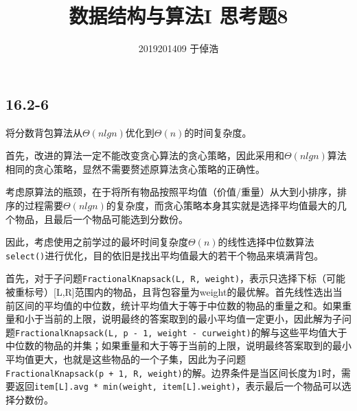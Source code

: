 \documentclass{article}
\title{数据结构与算法I 思考题8}
\author{2019201409 于倬浩}
\begin{document}
\maketitle

\hypertarget{header-n4}{%
\subsection{16.2-6}\label{header-n4}}

将分数背包算法从\(\Theta(nlgn)\)优化到\(\Theta(n)\)的时间复杂度。

首先，改进的算法一定不能改变贪心算法的贪心策略，因此采用和\(\Theta(nlgn)\)算法相同的贪心策略，显然不需要赘述原算法贪心策略的正确性。

考虑原算法的瓶颈，在于将所有物品按照平均值（价值/重量）从大到小排序，排序的过程需要\(\Theta(nlgn)\)的复杂度，而贪心策略本身其实就是选择平均值最大的几个物品，且最后一个物品可能选到分数份。

因此，考虑使用之前学过的最坏时间复杂度\(\Theta(n)\)的线性选择中位数算法\texttt{select()}进行优化，目的依旧是找出平均值最大的若干个物品来填满背包。

首先，对于子问题\texttt{FractionalKnapsack(L,\ R,\ weight)}，表示只选择下标（可能被重标号）{[}L,R{]}范围内的物品，且背包容量为weight的最优解。首先线性选出当前区间的平均值的中位数，统计平均值大于等于中位数的物品的重量之和。如果重量和小于当前的上限，说明最终的答案取到的最小平均值一定更小，因此解为子问题\texttt{FractionalKnapsack(L,\ p\ -\ 1,\ weight\ -\ curweight)}的解与这些平均值大于中位数的物品的并集；如果重量和大于等于当前的上限，说明最终答案取到的最小平均值更大，也就是这些物品的一个子集，因此为子问题\texttt{FractionalKnapsack(p\ +\ 1,\ R,\ weight)}的解。边界条件是当区间长度为1时，需要返回\texttt{item{[}L{]}.avg\ *\ min(weight,\ item{[}L{]}.weight)}，表示最后一个物品可以选择分数份。
\end{document}
